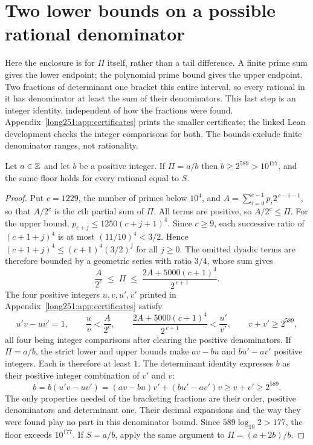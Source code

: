 \documentclass[11pt]{article}
\begin{document}
\section{Two lower bounds on a possible rational denominator}\label{long251:sec:denominator-floor}

Here the enclosure is for $\Pi$ itself, rather than a tail difference.
A finite prime sum gives the lower endpoint; the polynomial prime bound
gives the upper endpoint.  Two fractions of determinant one bracket this
entire interval, so every rational in it has denominator at least the sum
of their denominators.  This last step is an integer identity, independent
of how the fractions were found.  Appendix~\ref{long251:app:certificates}
prints the smaller certificate; the linked Lean development checks the
integer comparisons for both.  The bounds exclude finite denominator
ranges, not rationality.

\begin{theorem}\label{long251:res:denominatorfloor}
Let $a\in\mathbb{Z}$ and let $b$ be a positive integer.  If $\Pi=a/b$ then $b\ge2^{589}>10^{177}$, and
the same floor holds for every rational equal to $S$.
\end{theorem}

\begin{proof}
Put $c=1229$, the number of primes below $10^4$, and
$A=\sum_{i=0}^{c-1}p_i2^{\,c-i-1}$, so that $A/2^{c}$ is the $c$th partial sum
of $\Pi$.  All terms are positive, so $A/2^{c}\le\Pi$.  For the upper bound,
$p_{c+j}\le1250(c+j+1)^4$.  Since $c\ge9$, each successive ratio of
$(c+1+j)^4$ is at most $(11/10)^4<3/2$.  Hence
$(c+1+j)^4\le(c+1)^4(3/2)^j$ for all $j\ge0$.
The omitted dyadic terms are therefore bounded by a geometric series
with ratio $3/4$, whose sum gives
\[
 \frac{A}{2^{c}}\;\le\;\Pi\;\le\;\frac{2A+5000(c+1)^4}{2^{\,c+1}} .
\]
The four positive integers $u,v,u',v'$ printed in
Appendix~\ref{long251:app:certificates} satisfy
\[
 u'v-uv'=1,\qquad
 \frac uv<\frac{A}{2^{c}},\qquad
 \frac{2A+5000(c+1)^4}{2^{\,c+1}}<\frac{u'}{v'},\qquad
 v+v'\ge2^{589},
\]
all four being integer comparisons after clearing the positive denominators.
If $\Pi=a/b$, the strict lower and upper bounds make $av-bu$ and
$bu'-av'$ positive integers.  Each is therefore at least $1$.
The determinant identity expresses $b$ as their positive integer
combination of $v'$ and $v$:
\[
 b=b(u'v-uv')=(av-bu)v'+(bu'-av')v\ge v+v' \ge 2^{589}.
\]
The only properties needed of the bracketing fractions are their order,
positive denominators and determinant one.  Their decimal expansions
and the way they were found play no part in this denominator bound.
Since $589\log_{10}2>177$, the floor exceeds $10^{177}$.  If $S=a/b$, apply the
same argument to $\Pi=(a+2b)/b$.
\end{proof}
\end{document}
